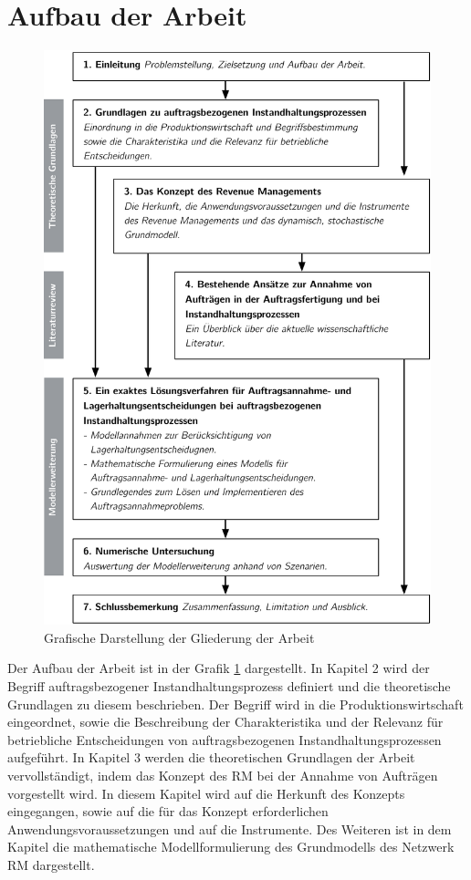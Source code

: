 \section{Aufbau der Arbeit}

\begin{figure}[h!]
  \begin{center}
    \includegraphics[width=140mm]{Bilder/Gliederung.pdf}
    \caption{Grafische Darstellung der Gliederung der Arbeit}  \label{Gliederung}
  \end{center}
\end{figure}


Der Aufbau der Arbeit ist in der Grafik \ref{Gliederung} dargestellt. In Kapitel 2 wird der Begriff \glqq auftragsbezogener Instandhaltungsprozess{\glqq} definiert und die theoretische Grundlagen zu diesem beschrieben. Der Begriff wird in die Produktionswirtschaft eingeordnet, sowie die Beschreibung der Charakteristika und der Relevanz für betriebliche Entscheidungen von auftragsbezogenen Instandhaltungsprozessen aufgeführt. In Kapitel 3 werden die theoretischen Grundlagen der Arbeit vervollständigt, indem das Konzept des RM bei der Annahme von Aufträgen vorgestellt wird. In diesem Kapitel wird auf die Herkunft des Konzepts eingegangen, sowie auf die für das Konzept erforderlichen Anwendungsvoraussetzungen und auf die Instrumente. Des Weiteren ist in dem Kapitel die mathematische Modellformulierung des Grundmodells des Netzwerk RM dargestellt.

